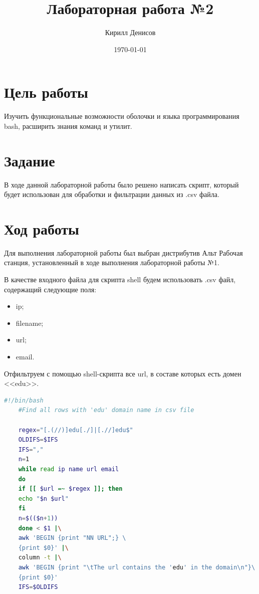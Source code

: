 \documentclass[a4paper,14pt]{extarticle}
\author{Кирилл Денисов}
\title{Лабораторная работа №2}
\date{\today}
\newcommand{\pathToCommonFolder}{/home/denilai/Documents/repos/latex/Common}
\begin{document}
	\thispagestyle{empty}
	
	\newpage
	
\normalsize

\section*{Цель работы}
Изучить функциональные возможности оболочки и языка программирования bash, расширить знания команд и утилит. 

\section*{Задание}
В ходе данной лабораторной работы было решено написать скрипт, который будет использован для обработки и фильтрации данных из .csv файла.


\section*{Ход работы}

Для выполнения лабораторной работы был выбран дистрибутив Альт Рабочая станция, установленный в ходе выполнения лабораторной работы №1. 

В качестве входного файла для скрипта shell будем использовать .csv файл, содержащий следующие поля:
\begin{itemize}
	\item ip;
	\item filename;
	\item url;
	\item email.
\end{itemize}

Отфильтруем с помощью shell-скрипта все url, в составе которых есть домен <<edu>>.

\begin{lstlisting}[language=Bash, caption={Вывод всех url, содержащих домен <<edu>>}]
	#!/bin/bash
	#Find all rows with 'edu' domain name in csv file
	
	regex="[.(//)]edu[./]|[.//]edu$"
	OLDIFS=$IFS
	IFS=","
	n=1
	while read ip name url email
	do
	if [[ $url =~ $regex ]]; then
	echo "$n $url"
	fi
	n=$(($n+1))
	done < $1 |\
	awk 'BEGIN {print "NN URL";} \
	{print $0}' |\
	column -t |\
	awk 'BEGIN {print "\tThe url contains the 'edu' in the domain\n"}\
	{print $0}'
	IFS=$OLDIFS
\end{lstlisting}
\end{document}
